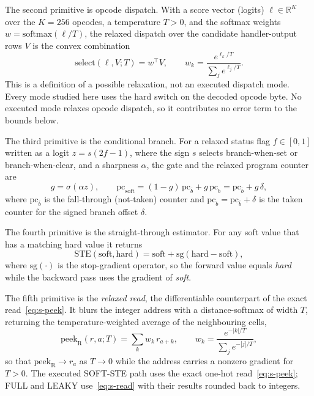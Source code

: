 \documentclass[letterpaper]{article} %
\newcommand{\sg}{\mathrm{sg}}
\newcommand{\softmax}{\mathrm{softmax}}
\begin{document}
The second primitive is opcode dispatch. With a score vector (logits)
$\ell\in\mathbb{R}^{K}$ over the $K=256$ opcodes, a temperature $T>0$, and the
softmax weights $w=\softmax(\ell/T)$, the relaxed dispatch over the candidate
handler-output rows $V$ is the convex combination
\begin{equation}
\mathrm{select}(\ell,V;T)=w^{\top}V,\qquad
w_k=\frac{e^{\ell_k/T}}{\sum_j e^{\ell_j/T}} .
\label{eq:s-select}
\end{equation}
This is a definition of a possible relaxation, not an executed
dispatch mode. Every mode studied here uses the hard switch
on the decoded opcode byte. No executed mode relaxes opcode
dispatch, so it contributes no error term to the bounds below.

The third primitive is the conditional branch. For a relaxed status flag
$f\in[0,1]$ written as a logit $z=s(2f-1)$, where the sign $s$ selects
branch-when-set or branch-when-clear, and a sharpness $\alpha$, the gate and the
relaxed program counter are
\begin{equation}
g=\sigma(\alpha z),\qquad
\mathrm{pc}_{\mathrm{soft}}=(1-g)\,\mathrm{pc}_{\bar b}+g\,\mathrm{pc}_{b}
=\mathrm{pc}_{\bar b}+g\,\delta ,
\label{eq:s-branch}
\end{equation}
where $\mathrm{pc}_{\bar b}$ is the fall-through (not-taken) counter and
$\mathrm{pc}_{b}=\mathrm{pc}_{\bar b}+\delta$ is the taken counter for the signed
branch offset $\delta$.

The fourth primitive is the straight-through estimator. For any soft value that
has a matching hard value it returns
\begin{equation}
\mathrm{STE}(\text{soft},\text{hard})=\text{soft}+\sg(\text{hard}-\text{soft}),
\label{eq:s-ste}
\end{equation}
where $\sg(\cdot)$ is the stop-gradient operator, so the forward value equals
\textit{hard} while the backward pass uses the gradient of \textit{soft}.

The fifth primitive is the \emph{relaxed read}, the differentiable counterpart of
the exact read~\eqref{eq:s-peek}. It blurs the integer address with a
distance-softmax of width $T$, returning the temperature-weighted average of the
neighbouring cells,
\begin{equation}
\mathrm{peek}_{\mathrm{R}}(r,a;T)=\textstyle\sum_k w_k\,r_{a+k},\qquad
w_k=\frac{e^{-|k|/T}}{\sum_j e^{-|j|/T}},
\label{eq:s-read}
\end{equation}
so that $\mathrm{peek}_{\mathrm{R}}\!\to r_a$ as $T\to0$ while the address carries
a nonzero gradient for $T>0$. The executed SOFT-STE path uses the exact one-hot
read~\eqref{eq:s-peek}; FULL and LEAKY use~\eqref{eq:s-read}
with their results rounded back to integers.
\end{document}
